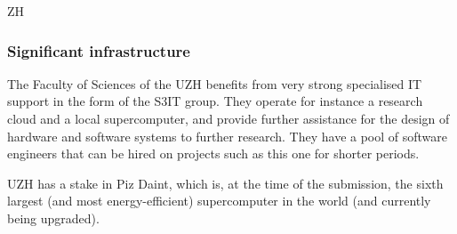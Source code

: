 \begin{sitedescription}{ZH}
\subsubsection*{Significant infrastructure}
\begin{compactenum}
\item The Faculty of Sciences of the UZH benefits from very strong specialised IT support in the form of the S3IT group. They operate for instance a research cloud and a local supercomputer,  and provide further assistance for the design of hardware and software systems to further research. They have a pool of software engineers that can be hired on projects such as this one for shorter periods.
\item UZH has a stake in Piz Daint, which is, at the time of the submission, 
the sixth largest (and most energy-efficient) supercomputer in the world
(and currently being upgraded).
\end{compactenum}
\end{sitedescription}


